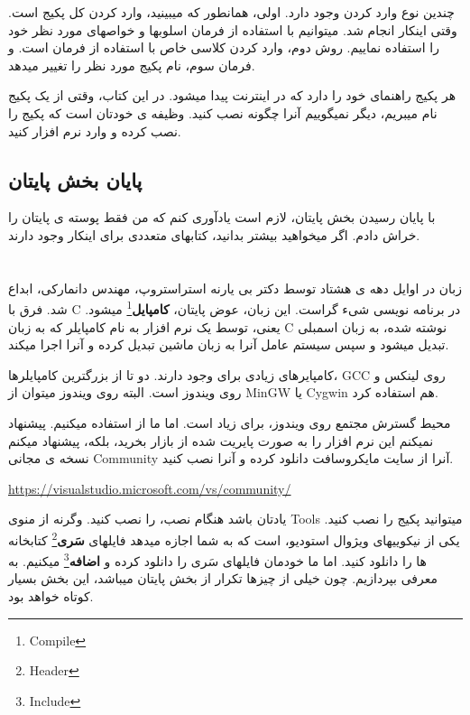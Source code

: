 \documentclass[14pt,a4paper]{memoir}
\begin{document}
 چندین نوع وارد کردن وجود دارد. اولی، همانطور که میبینید، وارد کردن کل پکیج است. وقتی اینکار انجام شد. میتوانیم با استفاده از فرمان  اسلوبها و خواصهای مورد نظر خود را استفاده نماییم. روش دوم، وارد کردن کلاسی خاص با استفاده از فرمان  است. و فرمان سوم، نام پکیج مورد نظر را تغییر میدهد. 
	 
	 
	 هر پکیج راهنمای خود را دارد که در اینترنت پیدا میشود. در این کتاب، وقتی از یک پکیج نام میبریم، دیگر نمیگوییم آنرا چگونه نصب کنید. وظیفه ی خودتان است که پکیج را نصب کرده و وارد نرم افزار کنید.
	 
	 \subsection{پایان بخش پایتان}
	 
	 با پایان رسیدن بخش پایتان، لازم است یادآوری کنم که من فقط پوسته ی پایتان را خراش دادم. اگر میخواهید بیشتر بدانید، کتابهای متعددی برای اینکار وجود دارند.
	 
	 
	 
	 \section{}\label{cpp}
	 زبان  در اوایل دهه ی هشتاد توسط دکتر بی ‌یارنه استراستروپ، مهندس دانمارکی، ابداع شد. فرق  با C در برنامه نویسی شیء گراست. این زبان، عوض پایتان، \textbf{کامپایل}\footnote{Compile} میشود. یعنی، توسط یک نرم افزار به نام کامپایلر که به زبان C نوشته شده، به زبان اسمبلی تبدیل میشود و سپس سیستم عامل آنرا به زبان ماشین تبدیل کرده و آنرا اجرا میکند. 
	 
	 
	 کامپایرهای زیادی برای  وجود دارند. دو تا از بزرگترین کامپایلرها، GCC روی لینکس و  روی ویندوز است. البته روی ویندوز میتوان از MinGW یا Cygwin هم استفاده کرد.
	  
	 محیط گسترش مجتمع روی ویندوز، برای  زیاد است. اما ما از  استفاده میکنیم. پیشنهاد نمیکنم این نرم افزار را به صورت پایریت شده از بازار بخرید، بلکه، پیشنهاد میکنم نسخه ی مجانی Community آنرا از سایت مایکروسافت دانلود کرده و آنرا نصب کنید.
	 
	 \url{https://visualstudio.microsoft.com/vs/community/}
	 
	 
	  یادتان باشد هنگام نصب،  را نصب کنید. وگرنه از منوی Tools میتوانید پکیج را نصب کنید. یکی از نیکوییهای ویژوال استودیو،  است که به شما اجازه میدهد فایلهای \textbf{سَری}\footnote{Header} کتابخانه ها را دانلود کنید. اما ما خودمان فایلهای سَری را دانلود کرده و \textbf{اضافه}\footnote{Include} میکنیم. به معرفی  بپردازیم. چون خیلی از چیزها تکرار از بخش پایتان میباشد، این بخش بسیار کوتاه خواهد بود.
	  
\end{document}

